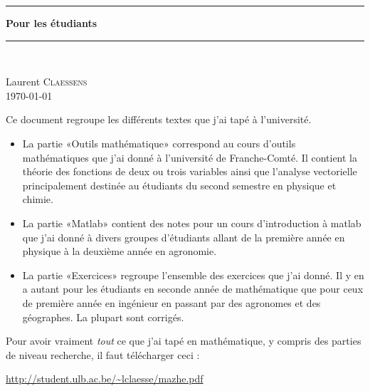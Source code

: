 
\thispagestyle{empty}
\begin{center}
  \begin{minipage}{15cm}
    \hrule\par
    \vspace{2mm}
    \begin{center}
    \Huge \bfseries  Pour les étudiants \par
    \end{center}
    \hrule\par
  \end{minipage}\\
\end{center}

\vspace{2cm}

\begin{center}
    Laurent \textsc{Claessens}\\
    \today
\end{center}

\vfill

\LogoEtLicence

\clearpage

\thispagestyle{empty}

Ce document regroupe les différents textes que j'ai tapé à l'université.
\begin{itemize}
    \item La partie «Outils mathématique» correspond au cours d'outils mathématiques que j'ai donné à l'université de Franche-Comté. Il contient la théorie des fonctions de deux ou trois variables ainsi que l'analyse vectorielle principalement destinée au étudiants du second semestre en physique et chimie.
    \item La partie «Matlab» contient des notes pour un cours d'introduction à matlab que j'ai donné à divers groupes d'étudiants allant de la première année en physique à la deuxième année en agronomie.
    \item La partie «Exercices» regroupe l'ensemble des exercices que j'ai donné. Il y en a autant pour les étudiants en seconde année de mathématique que pour ceux de première année en ingénieur en passant par des agronomes et des géographes. La plupart sont corrigés.
\end{itemize}

\vfill

Pour avoir vraiment \emph{tout} ce que j'ai tapé en mathématique, y compris des parties de niveau recherche, il faut télécharger ceci :
\begin{center}
    \url{http://student.ulb.ac.be/~lclaesse/mazhe.pdf}
\end{center}



\clearpage
